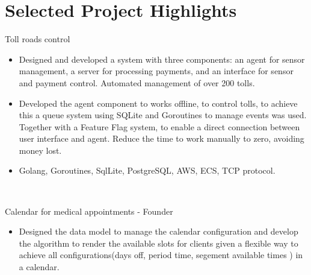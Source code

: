 \documentclass[letterpaper]{twentysecondcv} %
\begin{document}

\section{Selected Project Highlights}
\begin{twenty}

     \twentyitem
    
    
    {Toll roads control}
    {\href{}{}}
    {}
    {
    
        \begin{itemize}
            \item
	    Designed and developed a system with three components: an agent for sensor management, a server for processing payments, and an interface for sensor and payment control. Automated management of over 200 tolls. 
         \end{itemize}
         
        \begin{itemize}
            \item
            Developed the agent component to works offline, to control tolls, to achieve this a queue system using SQLite and Goroutines to manage events was used. 	Together with a Feature Flag system, to enable a direct connection between user interface and agent. Reduce the time to work manually to zero, avoiding money lost.
         \end{itemize}
         
         \begin{itemize}
            \item
            Golang, Goroutines, SqlLite, PostgreSQL, AWS, ECS, TCP protocol.
         \end{itemize}
         
    }
    \\
    
     \twentyitem

    
    {Calendar for medical appointments - Founder}
    {\href{}{}}
    {}
    {
    
        \begin{itemize}
            \item
	    Designed the data model to manage the calendar configuration and develop the algorithm to render the available slots for clients given a flexible way
	    to achieve all configurations(days off, period time, segement available times ) in a calendar. 
         \end{itemize}
         
}
\end{twenty}
\end{document}
